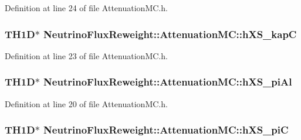 Definition at line 24 of file Attenuation\-M\-C.\-h.

\hypertarget{class_neutrino_flux_reweight_1_1_attenuation_m_c_afe67d35bfdea4d6b91bd6b16f7404bb2}{
\subsubsection[{h\-X\-S\-\_\-kap\-C}]{\setlength{\rightskip}{0pt plus 5cm}T\-H1\-D$\ast$ Neutrino\-Flux\-Reweight\-::\-Attenuation\-M\-C\-::h\-X\-S\-\_\-kap\-C}}\label{class_neutrino_flux_reweight_1_1_attenuation_m_c_afe67d35bfdea4d6b91bd6b16f7404bb2}


Definition at line 23 of file Attenuation\-M\-C.\-h.

\hypertarget{class_neutrino_flux_reweight_1_1_attenuation_m_c_a7a9edf7fb1e5af0611eacfaba7d63879}{
\subsubsection[{h\-X\-S\-\_\-pi\-Al}]{\setlength{\rightskip}{0pt plus 5cm}T\-H1\-D$\ast$ Neutrino\-Flux\-Reweight\-::\-Attenuation\-M\-C\-::h\-X\-S\-\_\-pi\-Al}}\label{class_neutrino_flux_reweight_1_1_attenuation_m_c_a7a9edf7fb1e5af0611eacfaba7d63879}


Definition at line 20 of file Attenuation\-M\-C.\-h.

\hypertarget{class_neutrino_flux_reweight_1_1_attenuation_m_c_aa7f4bb3745202fd3a48fb9e295317219}{
\subsubsection[{h\-X\-S\-\_\-pi\-C}]{\setlength{\rightskip}{0pt plus 5cm}T\-H1\-D$\ast$ Neutrino\-Flux\-Reweight\-::\-Attenuation\-M\-C\-::h\-X\-S\-\_\-pi\-C}}\label{class_neutrino_flux_reweight_1_1_attenuation_m_c_aa7f4bb3745202fd3a48fb9e295317219}


